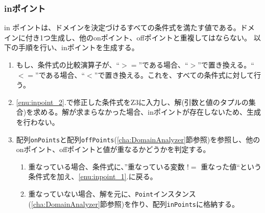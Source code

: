 \documentclass[uplatex, report, a4j, 10pt]{jsbook}
\newcommand\ttt[1]{\texttt{#1}}
\begin{document}
\subsubsection{inポイント}
in ポイントは、ドメインを決定づけるすべての条件式を満たす値である。ドメインに付き1つ生成し、他のonポイント、offポイントと重複してはならない。
以下の手順を行い、inポイントを生成する。
\begin{enumerate}
  \item\label{enu:inpoint_2} もし、条件式の比較演算子が、``$>=$''である場合、``$>$''で置き換える。``$<=$''である場合、``$<$''で置き換える。これを、すべての条件式に対して行う。
  \item\label{enu:inpoint_1} \ref{enu:inpoint_2}.で修正した条件式をZ3に入力し、解(引数と値のタプルの集合)を求める。解が求まらなかった場合、inポイントが存在しないため、生成を行わない。
  \item 配列\ttt{onPoints}と配列\ttt{offPoints}(\ref{cha:DomainAnalyzer}節参照)を参照し、他のonポイント、offポイントと値が重なるかどうかを判定する。
        \begin{enumerate}
          \item 重なっている場合、条件式に、''重なっている変数 $!=$ 重なった値``という条件式を加え、\ref{enu:inpoint_1}.に戻る。
          \item 重なっていない場合、解を元に、\ttt{Point}インスタンス(\ref{cha:DomainAnalyzer}節参照)を作り、配列\ttt{inPoints}に格納する。
        \end{enumerate}
\end{enumerate}
\end{document}
